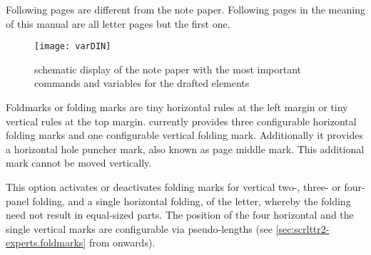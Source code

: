 Following pages are different from
the note paper. Following pages in the meaning of this manual are all letter
pages but the first one.

\begin{figure}
  \centering
  \texttt{[image: varDIN]}
  \caption{schematic display of the note paper with the most important
    commands and variables for the drafted elements}
  \label{fig:scrlttr2.variables}
\end{figure}

\begin{Declaration}
\end{Declaration}
%
Foldmarks or folding marks are tiny
horizontal rules at the left margin or tiny vertical rules at the top
margin. \KOMAScript{} currently provides three configurable horizontal folding
marks and one configurable vertical folding mark. Additionally it provides a
horizontal hole puncher mark, also known as page middle mark. This additional
mark cannot be moved vertically.

This option activates or deactivates folding marks for vertical
two-, three- or four-panel folding, and a single horizontal folding, of the
letter, whereby the folding need not result in equal-sized parts. The position
of the four horizontal and the single vertical marks are configurable via
pseudo-lengths (see \autoref{sec:scrlttr2-experts.foldmarks} from
 onwards).

